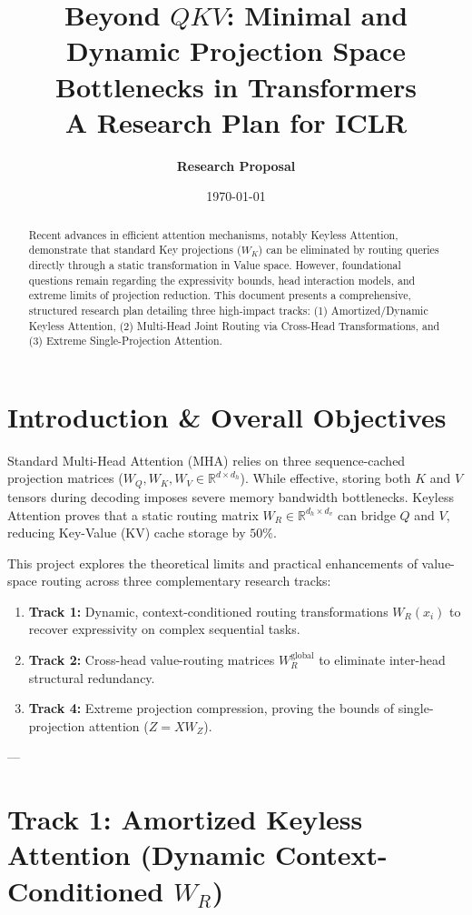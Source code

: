 \documentclass[11pt,a4paper]{article}
\title{\textbf{Beyond $QKV$: Minimal and Dynamic Projection Space Bottlenecks in Transformers}\\
\large A Research Plan for ICLR}
\author{\textbf{Research Proposal}}
\date{\today}
\begin{document}
\maketitle

\begin{abstract}
Recent advances in efficient attention mechanisms, notably Keyless Attention, demonstrate that standard Key projections ($W_K$) can be eliminated by routing queries directly through a static transformation in Value space. However, foundational questions remain regarding the expressivity bounds, head interaction models, and extreme limits of projection reduction. This document presents a comprehensive, structured research plan detailing three high-impact tracks: (1) Amortized/Dynamic Keyless Attention, (2) Multi-Head Joint Routing via Cross-Head Transformations, and (3) Extreme Single-Projection Attention.
\end{abstract}

\section{Introduction \& Overall Objectives}
Standard Multi-Head Attention (MHA) relies on three sequence-cached projection matrices ($W_Q, W_K, W_V \in \mathbb{R}^{d \times d_h}$). While effective, storing both $K$ and $V$ tensors during decoding imposes severe memory bandwidth bottlenecks. Keyless Attention proves that a static routing matrix $W_R \in \mathbb{R}^{d_h \times d_v}$ can bridge $Q$ and $V$, reducing Key-Value (KV) cache storage by $50\%$.

This project explores the theoretical limits and practical enhancements of value-space routing across three complementary research tracks:
\begin{enumerate}
    \item \textbf{Track 1:} Dynamic, context-conditioned routing transformations $W_R(x_i)$ to recover expressivity on complex sequential tasks.
    \item \textbf{Track 2:} Cross-head value-routing matrices $W_R^{\text{global}}$ to eliminate inter-head structural redundancy.
    \item \textbf{Track 4:} Extreme projection compression, proving the bounds of single-projection attention ($Z = X W_Z$).
\end{enumerate}

---

\section{Track 1: Amortized Keyless Attention (Dynamic Context-Conditioned $W_R$)}
\end{document}

